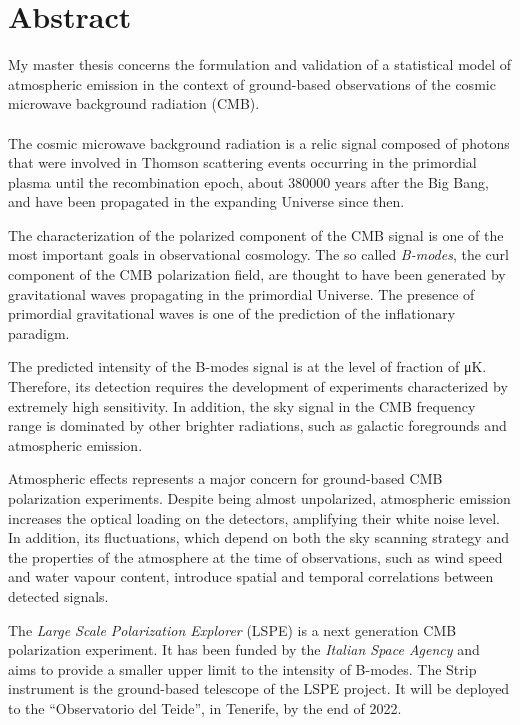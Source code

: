 \documentclass[11pt,letterpaper]{article}
\begin{document}
\section*{\centering Abstract}

My master thesis concerns the formulation and validation of a statistical
model of atmospheric emission in the context of ground-based observations
of the cosmic microwave background radiation (CMB).
\\\\
The cosmic microwave background radiation is a relic signal composed of
photons that were involved in Thomson scattering events occurring in the
primordial plasma until the recombination epoch, about \num{380000} years
after the Big Bang, and have been propagated in the expanding Universe
since then.

The characterization of the polarized component of the CMB signal is one of
the most important goals in observational cosmology. The so called
\emph{B-modes}, the curl component of the CMB polarization field, are
thought to have been generated by gravitational waves propagating in the
primordial Universe. The presence of primordial gravitational waves is one
of the prediction of the inflationary paradigm.

The predicted intensity of the B-modes signal is at the level of fraction
of \si{\micro\kelvin}. Therefore, its detection requires the development of
experiments characterized by extremely high sensitivity. In addition, the
sky signal in the CMB frequency range is dominated by other brighter
radiations, such as galactic foregrounds and atmospheric emission.

Atmospheric effects represents a major concern for ground-based CMB
polarization experiments. Despite being almost unpolarized, atmospheric
emission increases the optical loading on the detectors, amplifying their
white noise level. In addition, its fluctuations, which depend on both the
sky scanning strategy and the properties of the atmosphere at the time of
observations, such as wind speed and water vapour content, introduce
spatial and temporal correlations between detected signals.

The \emph{Large Scale Polarization Explorer} (LSPE) is a next generation
CMB polarization experiment. It has been funded by the \emph{Italian Space
Agency} and aims to provide a smaller upper limit to the intensity of
B-modes. The Strip instrument is the ground-based telescope of the LSPE
project. It will be deployed to the ``Observatorio del Teide'', in
Tenerife, by the end of 2022.
\end{document}
